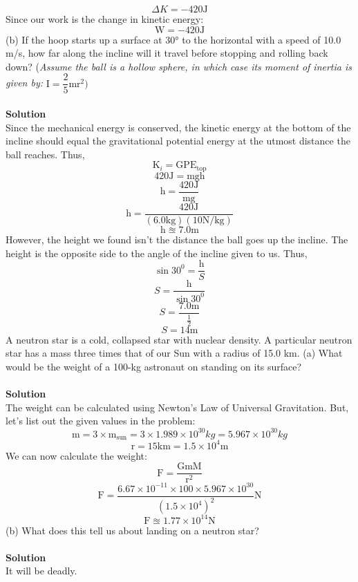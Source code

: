 \documentclass[9pt,addpoints]{exam}
\begin{document}
\begin{questions}
		$$\varDelta K=-420\text{J}$$
		Since our work is the change in kinetic energy:
		$$\text{W}=-420\text{J}$$
		(b) If the hoop starts up a surface at  30°  to the horizontal with a speed of 10.0 m/s, how far along the incline will it travel before stopping and rolling back down? (\textit{Assume the ball is a hollow sphere, in which case its moment of inertia is given by:} $\text{I}=\dfrac{2}{5}\text{mr}^2)$\\ \\ 
		\textbf{Solution} \\
		Since the mechanical energy is conserved, the kinetic energy at the bottom of the incline should equal the gravitational potential energy at the utmost distance the ball reaches. Thus,
		$$\text{K}_i=\text{GPE}_{\text{top}}$$
		$$420\text{J}=\text{mgh}$$
		$$\text{h}=\dfrac{420\text{J}}{\text{mg}}$$		
		$$\text{h}=\dfrac{420\text{J}}{(6.0\text{kg})(10\text{N/kg})}$$
		$$\text{h}\approxeq7.0\text{m}$$
		However, the height we found isn't the distance the ball goes up the incline. The height is the opposite side to the angle of the incline given to us. Thus,
		$$\sin30^0=\dfrac{\text{h}}{S}$$
		$$S=\dfrac{\text{h}}{\sin30^0}$$
		$$S=\dfrac{7.0\text{m}}{\frac{1}{2}}$$
		$$S=14\text{m}$$
		\question A neutron star is a cold, collapsed star with nuclear density. A particular neutron star has a mass three times that of our Sun with a radius of 15.0 km. (a) What would be the weight of a 100-kg astronaut on standing on its surface? \\ \\ 
		\textbf{Solution} \\
		The weight can be calculated using Newton's Law of Universal Gravitation. But, let's list out the given values in the problem:
		$$\text{m}=3\times \text{m}_{\text{sun}}=3\times1.989\times10^{30}kg=5.967\times10^{30}kg$$
		$$\text{r}=15\text{km}=1.5\times10^4\text{m}$$
		We can now calculate the weight:
		$$\text{F}=\dfrac{\text{GmM}}{\text{r}^2}$$
		$$\text{F}=\dfrac{6.67\times10^{-11}\times100\times5.967\times10^{30}}{(1.5\times10^{4})^2}\text{N}$$
		$$\text{F}\approxeq1.77\times10^{14}\text{N}$$
		 (b) What does this tell us about landing on a neutron star? \\ \\
		 \textbf{Solution} \\
		 It will be deadly.
	\end{questions}		
\end{document}
